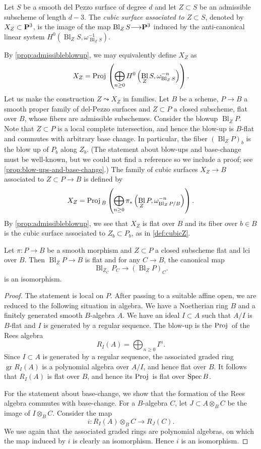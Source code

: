 \documentclass[12pt,reqno]{amsart}
\DeclareMathOperator{\Bl}{Bl}
\renewcommand{\to}{{\longrightarrow}}
\numberwithin{equation}{section}
\newcommand{\Proj}{{\text{\rm Proj}\,}}
\begin{document}
\begin{definition}
  \label{def:cubicZ}
  Let $S$ be a smooth del Pezzo surface of degree $d$ and let $Z \subset S$ be an admissible subscheme of length $d-3$.
  The \emph{cubic surface associated to $Z \subset S$}, denoted by
  $X_Z \subset \P^3$, is the image of the map
  $\Bl_{Z}S \to \P^3$ induced by the anti-canonical linear system $H^0\left(\Bl_ZS, \omega_{\Bl_Z S}^{-1}\right)$.
\end{definition}
By \autoref{prop:admissibleblowup}, we may equivalently define $X_Z$ as
\[ X_Z = \Proj \left( \bigoplus_{n \geq 0} H^0\left( \Bl_ZS, \omega_{\Bl_Z S}^{-n} \right) \right).\]
Let us make the construction $Z \leadsto X_Z$ in families.
Let $B$ be a scheme, $P \to B$ a smooth proper family of del-Pezzo surfaces and $Z \subset  P$ a closed subscheme, flat over $B$, whose fibers are admissible subschemes.
Consider the blowup $\Bl_{ Z}  P$.
Note that $Z \subset  P$ is a local complete intersection, and hence the blow-up is $B$-flat and commutes with arbitrary base change.
In particular, the fiber $(\Bl_ZP)_b$ is the blow up of $P_b$ along $Z_b$.
(The statement about blow-ups and base-change must be well-known, but we could not find a reference so we include a proof; see \autoref{prop:blow-ups-and-base-change}.)
The family of cubic surfaces $X_Z \to B$ associated to $Z \subset P \to B$ is defined by
\[
  X_Z = \Proj_B \left(\bigoplus_{n \geq 0}\pi_*\left(\Bl_ZP, \omega_{\Bl_ZP/B}^{-n}\right)\right).
\]
By \autoref{prop:admissibleblowup}, we see that $X_Z$ is flat over $B$
and its fiber over $b \in B$ is the cubic surface associated to
$Z_b \subset P_b$, as in \autoref{def:cubicZ}.
\begin{proposition}\label{prop:blow-ups-and-base-change}
  Let $\pi \colon P \to B$ be a smooth morphism and $Z \subset P$ a closed subscheme flat and lci over $B$.
  Then $\Bl_ZP \to B$ is flat and for any $C \to B$, the canonical map
  \[  \Bl_{Z_C} P_C \to \left(\Bl_ZP\right)_C.\]
  is an isomorphism.
\end{proposition}
\begin{proof}
  The statement is local on $P$.
  After passing to a suitable affine open, we are reduced to the following situation in algebra.
  We have a Noetherian ring $B$ and a finitely generated smooth $B$-algebra $A$.
  We have an ideal $I \subset A$ such that $A/I$ is $B$-flat and $I$ is generated by a regular sequence.
  The blow-up is the $\Proj$ of the Rees algebra
  \[R_I(A) = \bigoplus_{n \geq 0}I^n.\]
  Since $I \subset A$ is generated by a regular sequence, the associated graded ring $\operatorname{gr} R_I(A)$ is a polynomial algebra over $A/I$, and hence flat over $B$.
  It follows that $R_I(A)$ is flat over $B$, and hence its $\Proj$ is flat over $\spec B$.
  
  For the statement about base-change, we show that the formation of the Rees algebra commutes with base-change.
  For a $B$-algebra $C$, let $J \subset A \otimes_B C$ be the image of $I \otimes_B C$.
  Consider the map
  \[ i \colon R_I(A) \otimes_B C \to R_J(C).\]
  We use again that the associated graded rings are polynomial algebras, on which the map induced by $i$ is clearly an isomorphism.
  Hence $i$ is an isomorphism.
\end{proof}
\end{document}

